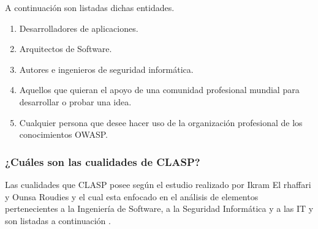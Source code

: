 \documentclass[runningheads,a4paper]{llncs}
\begin{document}
A continuación son listadas dichas entidades.

\begin{enumerate}
	\item Desarrolladores de aplicaciones.
	\item Arquitectos de \gls{Software}.
	\item Autores e ingenieros de seguridad informática.
	\item Aquellos que quieran el apoyo de una comunidad profesional mundial para desarrollar o probar una idea.
	\item Cualquier persona que desee hacer uso de la organización profesional de los conocimientos \gls{OWASP}.
\end{enumerate}
\subsubsection{¿Cuáles son las cualidades de \gls{CLASP}?}
Las cualidades que \gls{CLASP} posee según el estudio realizado por Ikram El rhaffari y Ounsa Roudies y el cual esta enfocado en el análisis de elementos pertenecientes a la Ingeniería de \gls{Software}, a la Seguridad Informática y a las \gls{IT} y son listadas a continuación \cite{BenchmarkingSDLCLAPS}. 
\end{document}
